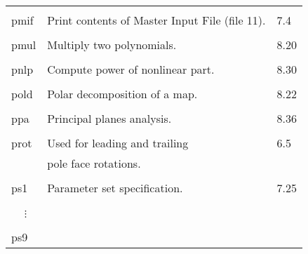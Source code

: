\begin{center}
\begin{tabular}{lll}
\vspace{-3mm}& &\\
\hspace{1.5em}pmif  & Print contents of Master Input File (file 11). & \hspace{2em}7.4\\
\vspace{-3mm}& &\\
\hspace{1.5em}pmul    &  Multiply two polynomials.   &   \hspace{2em}8.20\\
\vspace{-3mm}& &\\
\hspace{1.5em}pnlp   & Compute power of nonlinear part. &  \hspace{2em}8.30\\
\vspace{-3mm}& &\\
\hspace{1.5em}pold    &  Polar decomposition of a map.  & \hspace{2em}8.22\\
\vspace{-3mm}& &\\
\hspace{1.5em}ppa  &  Principal planes analysis.  & \hspace{2em}8.36\\
\vspace{-3mm}& &\\
\hspace{1.5em}prot   &  Used for leading and trailing   &  \hspace{2em}6.5 \\
               &    pole face rotations.            &      \\
\vspace{-3mm}& &\\
\hspace{1.5em}ps1   &   Parameter set specification.    & \hspace{2em}7.25\\
\vspace{-7mm}& &\\
\hspace{1.5em}\ \ \,$\vdots$ & &\\
\vspace{-7mm}& &\\
\hspace{1.5em}ps9   & &\\

\end{tabular}
\end{center}
